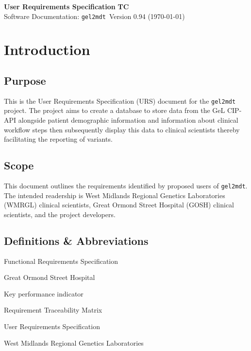 \documentclass[a4paper, 10pt]{article}
\begin{document}
\noindent
\large\textbf{User Requirements Specification} \hfill \textbf{TC} \\
\normalsize Software Documentation: \texttt{gel2mdt }\hfill Version 0.94 (\today) \\

\tableofcontents

\section{Introduction}
\subsection{Purpose}
This is the User Requirements Specification (URS) document for the \texttt{gel2mdt} project. The project aims to create a database to store data from the GeL CIP-API alongside patient demographic information and information about clinical workflow steps then subsequently display this data to clinical scientists thereby facilitating the reporting of variants.

\subsection{Scope}
This document outlines the requirements identified by proposed users of \texttt{gel2mdt}. The intended readership is West Midlands Regional Genetics Laboratories (WMRGL) clinical scientists, Great Ormond Street Hospital (GOSH) clinical scientists, and the project developers.

\subsection{Definitions \& Abbreviations}
\begin{description}[align=right,labelwidth=2cm]
    \setlength\itemsep{-0.3em}
    \item [FRS] Functional Requirements Specification
    \item [GOSH] Great Ormond Street Hospital
    \item [KPI] Key performance indicator
    \item [RTM] Requirement Traceability Matrix
    \item [URS] User Requirements Specification
    \item [WMRGL] West Midlands Regional Genetics Laboratories
\end{description}
\end{document}
